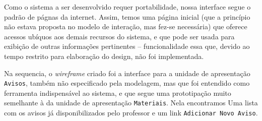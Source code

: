 			Como o sistema a ser desenvolvido requer portabilidade, nossa 
			interface segue o padrão de págnas da internet. Assim, temos uma página 
			inicial (que a princípio não estava proposta no modelo de interação, mas fez-se
			necessária) que oferece acessos ubíquos aos demais recursos do sistema, e que 
			pode ser usada para exibição de outras informações pertinentes -- funcionalidade essa que, devido ao 
			tempo restrito para elaboração do design, não foi implementada.
			
		
			Na sequencia, o \emph{wireframe} criado foi a interface para a unidade de 
			apresentação \texttt{Avisos}, também não especificado pela modelagem, mas que foi 
			entendido como ferramenta indispensável ao sistema, e que segue uma prototipação
			muito semelhante à da unidade de apresentação \texttt{Materiais}. Nela encontramos 
			Uma lista com os avisos já disponibilizados 
			pelo professor e um link \texttt{Adicionar Novo Aviso}.
		
		
		
		
		
		
		
		
		
		
		
		
		
		
		
		
		
		
		
